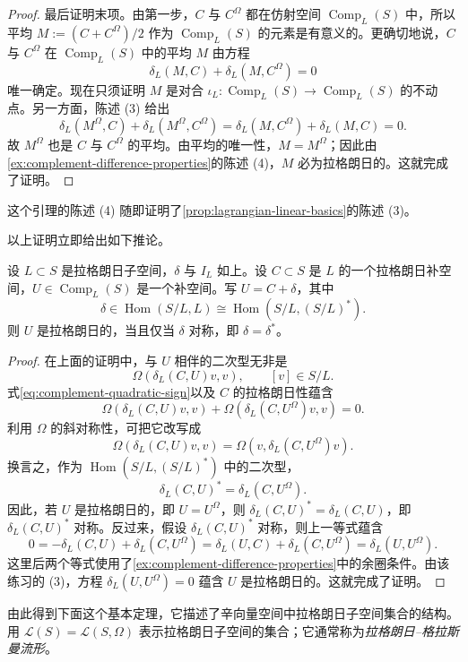 \begin{proof}
最后证明末项。由第一步，$C$ 与 $C^\Omega$ 都在仿射空间
$\operatorname{Comp}_L(S)$ 中，所以平均 $M:=(C+C^\Omega)/2$ 作为
$\operatorname{Comp}_L(S)$ 的元素是有意义的。更确切地说，$C$ 与 $C^\Omega$ 在
$\operatorname{Comp}_L(S)$ 中的平均 $M$ 由方程
\[
 \delta_L(M,C)+\delta_L(M,C^\Omega)=0
\]
唯一确定。现在只须证明 $M$ 是对合
$\iota_L:\operatorname{Comp}_L(S)\to\operatorname{Comp}_L(S)$ 的不动点。另一方面，陈述 (3) 给出
\[
 \delta_L(M^\Omega,C)+\delta_L(M^\Omega,C^\Omega)
 =\delta_L(M,C^\Omega)+\delta_L(M,C)=0.
\]
故 $M^\Omega$ 也是 $C$ 与 $C^\Omega$ 的平均。由平均的唯一性，$M=M^\Omega$；因此由\cref{ex:complement-difference-properties}的陈述 (4)，$M$ 必为拉格朗日的。这就完成了证明。
\end{proof}

这个引理的陈述 (4) 随即证明了\cref{prop:lagrangian-linear-basics}的陈述 (3)。

以上证明立即给出如下推论。

\begin{corollary}\label{cor:symmetric-lagrangian-complement}
设 $L\subset S$ 是拉格朗日子空间，$\delta$ 与 $I_L$ 如上。设 $C\subset S$ 是 $L$ 的一个拉格朗日补空间，$U\in\operatorname{Comp}_L(S)$ 是一个补空间。写
$U=C+\delta$，其中
\[
 \delta\in\operatorname{Hom}(S/L,L)
 \cong\operatorname{Hom}(S/L,(S/L)^*).
\]
则 $U$ 是拉格朗日的，当且仅当 $\delta$ 对称，即 $\delta=\delta^*$。
\end{corollary}

\begin{proof}
在上面的证明中，与 $U$ 相伴的二次型无非是
\[
 \Omega(\delta_L(C,U)v,v),\qquad [v]\in S/L.
\]
式\eqref{eq:complement-quadratic-sign}以及 $C$ 的拉格朗日性蕴含
\[
 \Omega(\delta_L(C,U)v,v)+\Omega(\delta_L(C,U^\Omega)v,v)=0.
\]
利用 $\Omega$ 的斜对称性，可把它改写成
\[
 \Omega(\delta_L(C,U)v,v)=\Omega(v,\delta_L(C,U^\Omega)v).
\]
换言之，作为 $\operatorname{Hom}(S/L,(S/L)^*)$ 中的二次型，
\[
 \delta_L(C,U)^*=\delta_L(C,U^\Omega).
\]
因此，若 $U$ 是拉格朗日的，即 $U=U^\Omega$，则
$\delta_L(C,U)^*=\delta_L(C,U)$，即 $\delta_L(C,U)^*$ 对称。反过来，假设
$\delta_L(C,U)^*$ 对称，则上一等式蕴含
\[
 0=-\delta_L(C,U)+\delta_L(C,U^\Omega)
   =\delta_L(U,C)+\delta_L(C,U^\Omega)
   =\delta_L(U,U^\Omega).
\]
这里后两个等式使用了\cref{ex:complement-difference-properties}中的余圈条件。由该练习的 (3)，方程 $\delta_L(U,U^\Omega)=0$ 蕴含 $U$ 是拉格朗日的。这就完成了证明。
\end{proof}

由此得到下面这个基本定理，它描述了辛向量空间中拉格朗日子空间集合的结构。用
$\mathcal L(S)=\mathcal L(S,\Omega)$ 表示拉格朗日子空间的集合；它通常称为\emph{拉格朗日--格拉斯曼流形}。

